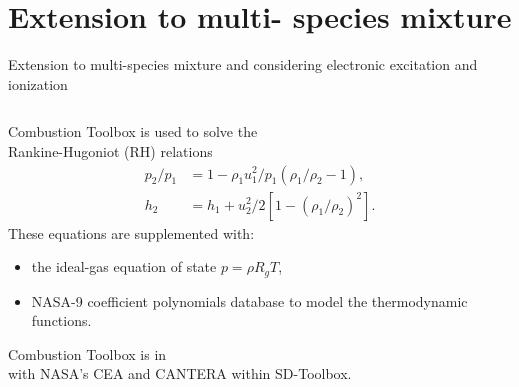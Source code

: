 \documentclass[9pt, aspectratio=1609]{beamer}
\newcommand{\acl}[1]{{\color{cardinalred}{#1}}}
\begin{document}
\section{Extension to multi- species mixture}
\begin{frame}{\normalsize Extension to multi-species mixture and considering electronic excitation and ionization}
\vspace{-0.5cm}
\begin{columns}[t]
    \begin{column}{.55\textwidth}
    
    \begin{center}
    \end{center}
    
    \hspace{0.3cm} Combustion Toolbox is used to solve the\\
    \hspace{0.3cm} Rankine-Hugoniot (RH) relations
    \begin{equation*}
        \begin{aligned}
        p_2/p_1 &= 1 - \rho_1 u_1^2/p_1 \left(\rho_1/\rho_2 - 1\right),\\
        h_2 &= h_1 + u_2^2/2\left[1- \left(\rho_1/\rho_2\right)^2\right].
        \end{aligned}
    \end{equation*}
    \hspace{0.3cm} These equations are supplemented with:
    \begin{itemize}
        \item the ideal-gas equation of state $p =\rho R_{g} T$,
        \item NASA-9 coefficient polynomials database to model the thermodynamic functions.
    \end{itemize}
    \hspace{0.3cm} Combustion Toolbox is in \acl{excellent agreement}\\
    \hspace{0.3cm} with NASA's CEA and CANTERA within SD-Toolbox.
    

\end{column}
\end{columns}
\end{frame}
\end{document}
